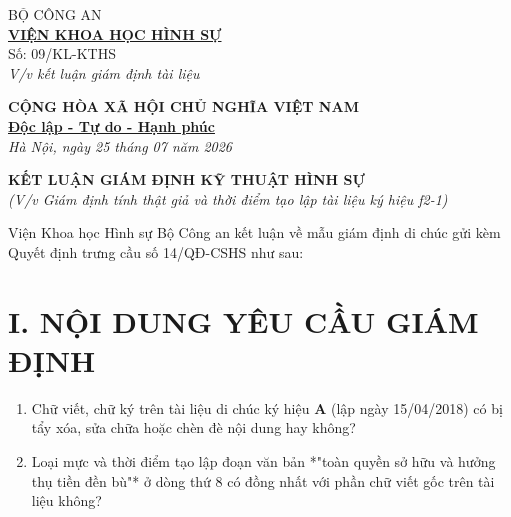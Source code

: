 \documentclass[12pt,a4paper]{article}
\begin{document}
\noindent
\begin{minipage}[t]{0.45\textwidth}
    \begin{center}
        \small
        BỘ CÔNG AN\\
        \textbf{\underline{VIỆN KHOA HỌC HÌNH SỰ}}\\[0.1cm]
        Số: 09/KL-KTHS\\
        \textit{V/v kết luận giám định tài liệu}
    \end{center}
\end{minipage}
\hfill
\begin{minipage}[t]{0.52\textwidth}
    \begin{center}
        \small
        \textbf{CỘNG HÒA XÃ HỘI CHỦ NGHĨA VIỆT NAM}\\
        \textbf{\underline{Độc lập - Tự do - Hạnh phúc}}\\[0.1cm]
        \textit{Hà Nội, ngày 25 tháng 07 năm 2026}
    \end{center}
\end{minipage}

\vspace{0.6cm}

\begin{center}
    \textbf{\large KẾT LUẬN GIÁM ĐỊNH KỸ THUẬT HÌNH SỰ}\\
    \textit{(V/v Giám định tính thật giả và thời điểm tạo lập tài liệu ký hiệu f2-1)}
\end{center}

\vspace{0.3cm}

\noindent Viện Khoa học Hình sự Bộ Công an kết luận về mẫu giám định di chúc gửi kèm Quyết định trưng cầu số 14/QĐ-CSHS như sau:

\section*{I. NỘI DUNG YÊU CẦU GIÁM ĐỊNH}
\begin{enumerate}[label=\arabic*., leftmargin=1.5cm]
    \item Chữ viết, chữ ký trên tài liệu di chúc ký hiệu \textbf{A} (lập ngày 15/04/2018) có bị tẩy xóa, sửa chữa hoặc chèn đè nội dung hay không?
    \item Loại mực và thời điểm tạo lập đoạn văn bản *"toàn quyền sở hữu và hưởng thụ tiền đền bù"* ở dòng thứ 8 có đồng nhất với phần chữ viết gốc trên tài liệu không?
\end{enumerate}
\end{document}

